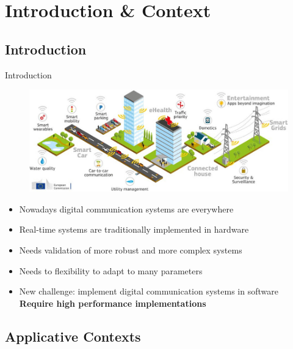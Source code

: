 
\section[Introduction]{Introduction \& Context}

\subsection[Introduction]{Introduction}

\begin{frame}{Introduction}
  \begin{figure}[htp]
  \centering
  \includegraphics[scale=0.35]{pics/5G_crop}
  \end{figure}
  \begin{itemize}
    \item Nowadays digital communication systems are everywhere
    \item Real-time systems are traditionally implemented in hardware
    \item Needs validation of more robust and more complex systems
    \item Needs to flexibility to adapt to many parameters
    \item New challenge: implement digital communication systems in software
      \\\vspace*{.5em}
      {\color{bleuUni}\Large\MVRightarrow} \textbf{Require high performance implementations}
  \end{itemize}
\end{frame}

\subsection[Applicative Contexts]{Applicative Contexts}

